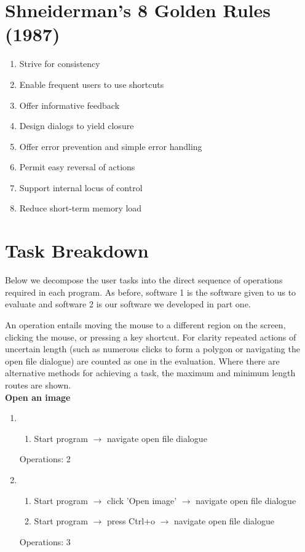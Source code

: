 \documentclass[a4paper,11pt,oneside]{article}
\begin{document}
\section{Shneiderman’s 8 Golden Rules (1987)}
\label{sec:s_rules}
\begin{enumerate}
    \item Strive for consistency
    \item Enable frequent users to use shortcuts
    \item Offer informative feedback
    \item Design dialogs to yield closure
    \item Offer error prevention and simple error handling
    \item Permit easy reversal of actions
    \item Support internal locus of control
    \item Reduce short-term memory load 
\end{enumerate}

\section{Task Breakdown}
\label{sec:task_breakdown}

Below we decompose the user tasks into the direct sequence of operations required in each program. As before, software 1 is the software given to us to evaluate and software 2 is our software we developed in part one.

An operation entails moving the mouse to a different region on the screen, clicking the mouse, or pressing a key shortcut. For clarity repeated actions of uncertain length (such as numerous clicks to form a polygon or navigating the open file dialogue) are counted as one in the evaluation. Where there are alternative methods for achieving a task, the maximum and minimum length routes are shown.\\

{\bf Open an image}
\begin{enumerate}
    \item
    \begin{enumerate}
        \item Start program $\rightarrow$ navigate open file dialogue
    \end{enumerate}
    Operations: 2
    \item
    \begin{enumerate}
        \item Start program $\rightarrow$ click 'Open image' $\rightarrow$ navigate open file dialogue
        \item Start program $\rightarrow$ press Ctrl+o $\rightarrow$ navigate open file dialogue
    \end{enumerate}
    Operations: 3
\end{enumerate}
\end{document}
